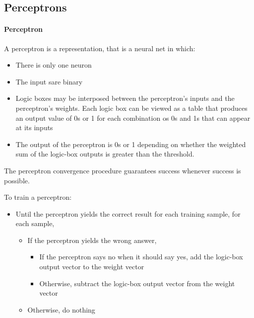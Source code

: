 \subsection{Perceptrons}

\paragraph{Perceptron} A perceptron is a representation, that is a
neural net in which:
\begin{itemize}
  \item There is only one neuron
  \item The input sare binary
  \item Logic boxes may be interposed between the perceptron's
    inputs and the perceptron's weights. Each logic box can be
    viewed as a table that produces an output value of 0s or 1 for
    each combination os 0s and 1s that can appear at its inputs
  \item The output of the perceptron is 0s or 1 depending on
    whether the weighted sum of the logic-box outputs is greater
    than the threshold.
\end{itemize}

The perceptron convergence procedure guarantees success whenever
success is possible.

To train a perceptron:
\begin{itemize}
  \item Until the perceptron yields the correct result for each
    training sample, for each sample,
    \begin{itemize}
      \item If the perceptron yields the wrong answer,
        \begin{itemize}
          \item If the perceptron says no when it should say yes,
            add the logic-box output vector to the weight vector
          \item Otherwise, subtract the logic-box output vector
            from the weight vector
        \end{itemize}
      \item Otherwise, do nothing
    \end{itemize}
\end{itemize}

